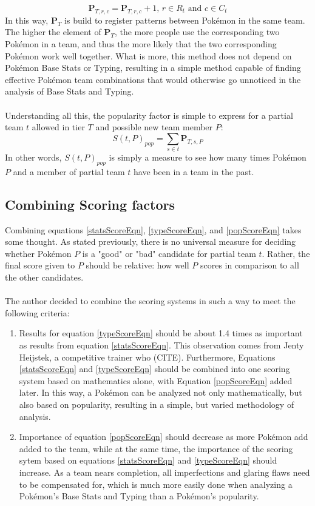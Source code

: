 \documentclass{article}
\begin{document}
\begin{equation*}
	\textbf{P}_{T,r,c}=\textbf{P}_{T,r,c}+1\text{, }r\in R_t\text{ and }c\in C_t
\end{equation*}
In this way, $\textbf{P}_T$ is build to register patterns between Pok\'emon in the same team. The higher the element of $\textbf{P}_T$, the more people use the corresponding two Pok\'emon in a team, and thus the more likely that the two corresponding Pok\'emon work well together. What is more, this method does not depend on Pok\'emon Base Stats or Typing, resulting in a simple method capable of finding effective Pok\'emon team combinations that would otherwise go unnoticed in the analysis of Base Stats and Typing.\\\\
Understanding all this, the popularity factor is simple to express for a partial team $t$ allowed in tier $T$ and possible new team member $P$:
\begin{equation}\label{popScoreEqn}
	S(t,P)_{pop}=\sum_{s\in t}\textbf{P}_{T,s,P}
\end{equation}
In other words, $S(t,P)_{pop}$ is simply a measure to see how many times Pok\'emon $P$ and a member of partial team $t$ have been in a team in the past.
\subsection{Combining Scoring factors}
Combining equations \ref{statsScoreEqn}, \ref{typeScoreEqn}, and \ref{popScoreEqn} takes some thought. As stated previously, there is no universal measure for deciding whether Pok\'emon $P$ is a "good" or "bad" candidate for partial team $t$. Rather, the final score given to $P$ should be relative: how well $P$ scores in comparison to all the other candidates.\\\\
The author decided to combine the scoring systems in such a way to meet the following criteria:
\begin{enumerate}
	\item Results for equation \ref{typeScoreEqn} should be about 1.4 times as important as results from equation \ref{statsScoreEqn}. This observation comes from Jenty Heijstek, a competitive trainer who (CITE). Furthermore, Equations \ref{statsScoreEqn} and \ref{typeScoreEqn} should be combined into one scoring system based on mathematics alone, with Equation \ref{popScoreEqn} added later. In this way, a Pok\'emon can be analyzed not only mathematically, but also based on popularity, resulting in a simple, but varied methodology of analysis.
	\item Importance of equation \ref{popScoreEqn} should decrease as more Pok\'emon add added to the team, while at the same time, the importance of the scoring sytem based on equations \ref{statsScoreEqn} and \ref{typeScoreEqn} should increase. As a team nears completion, all imperfections and glaring flaws need to be compensated for, which is much more easily done when analyzing a Pok\'emon's Base Stats and Typing than a Pok\'emon's popularity. 
\end{enumerate}
\end{document}

